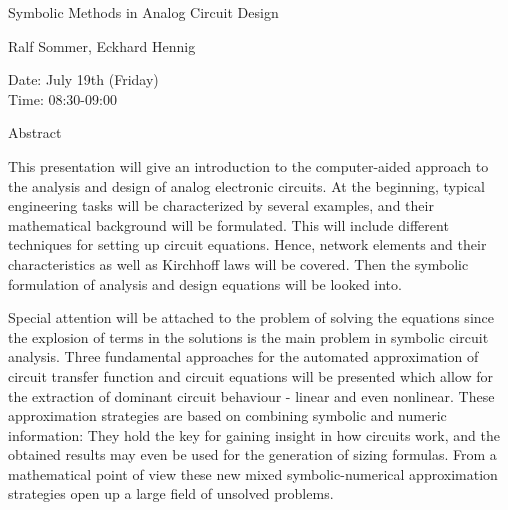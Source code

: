 \begin{center}
\LARGE
Symbolic Methods in Analog Circuit Design
\end{center}

\begin{center}
\Large
Ralf Sommer, Eckhard Hennig

\end{center}

\noindent
Date:  July 19th (Friday)\\
Time:  08:30-09:00\\

\begin{center}
\large
Abstract
\end{center}

This presentation will give an introduction to the computer-aided approach to the analysis and
design of analog electronic circuits. At the beginning, typical engineering tasks will be
characterized by several examples, and their mathematical background will be formulated. This
will include different techniques for setting up circuit equations. Hence, network elements and
their characteristics as well as Kirchhoff laws will be covered. Then the symbolic formulation of
analysis and design equations will be looked into. 

Special attention will be attached to the problem of solving the equations since the explosion of
terms in the solutions is the main problem in symbolic circuit analysis. Three fundamental
approaches for the automated approximation of circuit transfer function and circuit equations will
be presented which allow for the extraction of dominant circuit behaviour - linear and even
nonlinear. These approximation strategies are based on combining symbolic and numeric
information: They hold the key for gaining insight in how circuits work, and the obtained results
may even be used for the generation of sizing formulas. From a mathematical point of view these
new mixed symbolic-numerical approximation strategies open up a large field of unsolved
problems. 

